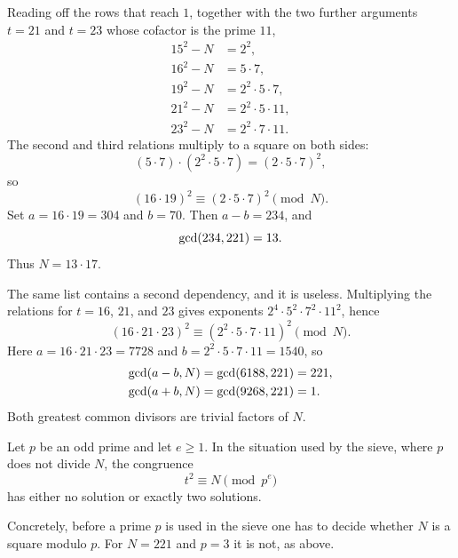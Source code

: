 \begin{example}[Sieving \(F(t)=t^{2}-221\)]
\begingroup\samepage
Reading off the rows that reach \(1\), together with the two further
arguments \(t=21\) and \(t=23\) whose cofactor is the prime \(11\),
\begin{align*}
    15^{2}-N &= 2^{2},\\
    16^{2}-N &= 5\cdot 7,\\
    19^{2}-N &= 2^{2}\cdot 5\cdot 7,\\
    21^{2}-N &= 2^{2}\cdot 5\cdot 11,\\
    23^{2}-N &= 2^{2}\cdot 7\cdot 11.
\end{align*}
\endgroup
The second and third relations multiply to a square on both sides:
\[
    (5\cdot 7)\cdot(2^{2}\cdot 5\cdot 7)
    =(2\cdot 5\cdot 7)^{2},
\]
so
\[
    (16\cdot 19)^{2}\equiv(2\cdot 5\cdot 7)^{2}\pmod{N}.
\]
Set \(a=16\cdot 19=304\) and \(b=70\). Then \(a-b=234\), and
\[
    \operatorname{gcd}(234,221)=13.
\]
Thus \(N=13\cdot 17\).
\end{example}


The same list contains a second dependency, and it is useless. Multiplying
the relations for \(t=16\), \(21\), and \(23\) gives exponents
\(2^{4}\cdot 5^{2}\cdot 7^{2}\cdot 11^{2}\), hence
\[
    (16\cdot 21\cdot 23)^{2}
    \equiv(2^{2}\cdot 5\cdot 7\cdot 11)^{2}\pmod{N}.
\]
Here \(a=16\cdot 21\cdot 23=7728\) and \(b=2^{2}\cdot 5\cdot 7\cdot 11=1540\), so
\begin{align*}
    \operatorname{gcd}(a-b,N)&=\operatorname{gcd}(6188,221)=221,\\
    \operatorname{gcd}(a+b,N)&=\operatorname{gcd}(9268,221)=1.
\end{align*}
Both greatest common divisors are trivial factors of \(N\).

\begin{remark}
Let \(p\) be an odd prime and let \(e\ge 1\). In the situation used by the
sieve, where \(p\) does not divide \(N\), the congruence
\[
    t^{2}\equiv N\pmod{p^{e}}
\]
has either no solution or exactly two solutions.
\end{remark}

Concretely, before a prime \(p\) is used in the sieve one has to decide
whether \(N\) is a square modulo \(p\). For \(N=221\) and \(p=3\) it is not,
as above.

